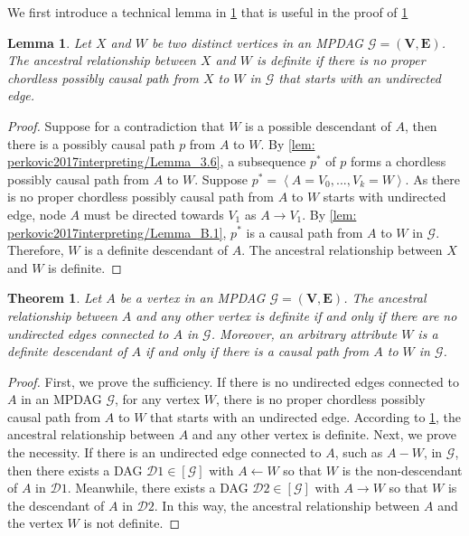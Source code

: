 \documentclass{article} %
\newtheorem{theorem}{Theorem}[section]
\newtheorem{lemma}{Lemma}[section]
\begin{document}
We first introduce a technical lemma in \cref{lem: definite ancestral relationship between X and W} that is useful in the proof of \cref{theo: definite ancestral relationship}

\begin{lemma} \label{lem: definite ancestral relationship between X and W}
    Let $X$ and $W$ be two distinct vertices in an MPDAG $\mathcal{G}=(\mathbf{V}, \mathbf{E})$. The ancestral relationship between $X$ and $W$ is definite if there is no proper chordless possibly causal path from $X$ to $W$ in $\mathcal{G}$ that starts with an undirected edge.
\end{lemma}
\begin{proof}
    Suppose for a contradiction that $W$ is a possible descendant of $A$, then there is a possibly causal path $p$ from $A$ to $W$. By \cref{lem: perkovic2017interpreting/Lemma_3.6}, a subsequence $p^{*}$ of $p$ forms a chordless possibly causal path from $A$ to $W$. Suppose $p^{*} = \left \langle A=V_0,...,V_k = W \right \rangle$. As there is no proper chordless possibly causal path from $A$ to $W$ starts with undirected edge, node $A$ must be directed towards $V_1$ as $A \rightarrow V_1$. By \cref{lem: perkovic2017interpreting/Lemma_B.1}, $p^{*}$ is a causal path from $A$ to $W$ in $\mathcal{G}$. Therefore, $W$ is a definite descendant of $A$. The ancestral relationship between $X$ and $W$ is definite.
\end{proof}

\begin{theorem} \label{theo: definite ancestral relationship}
Let $A$ be a vertex in an MPDAG $\mathcal{G}=(\mathbf{V}, \mathbf{E})$. The ancestral relationship between $A$ and any other vertex is definite if and only if there are no undirected edges connected to $A$ in $\mathcal{G}$. Moreover, an arbitrary attribute $W$ is a definite descendant of $A$ if and only if there is a causal path from $A$ to $W$ in $\mathcal{G}$.
\end{theorem}
\begin{proof}
    First, we prove the sufficiency. If there is no undirected edges connected to $A$ in an MPDAG $\mathcal{G}$, for any vertex $W$, there is no proper chordless possibly causal path from $A$ to $W$ that starts with an undirected edge. According to \cref{lem: definite ancestral relationship between X and W}, the ancestral relationship between $A$ and any other vertex is definite. Next, we prove the necessity. If there is an undirected edge connected to $A$, such as $A - W$, in $\mathcal{G}$, then there exists a DAG $\mathcal{D}1 \in [\mathcal{G}]$ with $A \leftarrow W$ so that $W$ is the non-descendant of $A$ in $\mathcal{D}1$. Meanwhile, there exists a DAG $\mathcal{D}2 \in [\mathcal{G}]$ with $A \rightarrow W$ so that $W$ is the descendant of $A$ in $\mathcal{D}2$. In this way, the ancestral relationship between $A$ and the vertex $W$ is not definite.
\end{proof}
\end{document}
